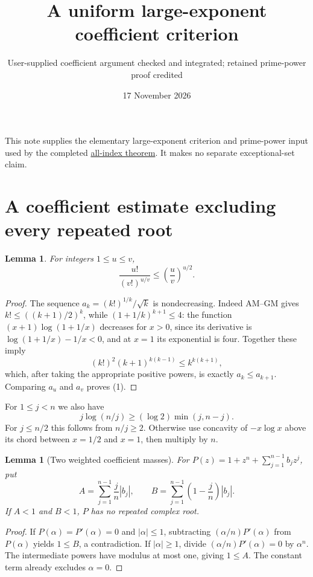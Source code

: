 \documentclass[11pt]{article}
\title{A uniform large-exponent coefficient criterion}
\author{User-supplied coefficient argument checked and integrated; retained prime-power proof credited}
\date{17 November 2026}
\newtheorem{lemma}[theorem]{Lemma}
\begin{document}
\maketitle
This note supplies the elementary large-exponent criterion and prime-power input used by the completed \href{ALL_UNIVARIATE_TWO_TERM_SFC.tex}{all-index theorem}. It makes no separate exceptional-set claim.

\section{A coefficient estimate excluding every repeated root}
\begin{lemma}\label{lem:factorial}
For integers $1\le u\le v$,
\[
 \frac{u!}{(v!)^{u/v}}\le\left(\frac uv\right)^{u/2}. \tag{1}
\]
\end{lemma}
\begin{proof}
The sequence $a_k=(k!)^{1/k}/\sqrt k$ is nondecreasing.
Indeed AM--GM gives $k!\le((k+1)/2)^k$, while
$(1+1/k)^{k+1}\le4$: the function
$(x+1)\log(1+1/x)$ decreases for $x>0$, since its derivative is
$\log(1+1/x)-1/x<0$, and at $x=1$ its exponential is four.
Together these imply
\[
 (k!)^2(k+1)^{k(k-1)}\le k^{k(k+1)},
\]
which, after taking the appropriate positive powers, is exactly
$a_k\le a_{k+1}$. Comparing $a_u$ and $a_v$ proves (1).
\end{proof}

For $1\le j<n$ we also have
\[
 j\log(n/j)\ge(\log2)\min(j,n-j). \tag{2}
\]
For $j\le n/2$ this follows from $n/j\ge2$.
Otherwise use concavity of $-x\log x$ above its chord between
$x=1/2$ and $x=1$, then multiply by $n$.

\begin{lemma}[Two weighted coefficient masses]\label{lem:masses}
For $P(z)=1+z^n+\sum_{j=1}^{n-1}b_jz^j$, put
\[
 A=\sum_{j=1}^{n-1}\frac jn|b_j|,\qquad
 B=\sum_{j=1}^{n-1}\left(1-\frac jn\right)|b_j|.
\]
If $A<1$ and $B<1$, $P$ has no repeated complex root.
\end{lemma}
\begin{proof}
If $P(\alpha)=P'(\alpha)=0$ and $|\alpha|\le1$, subtracting
$(\alpha/n)P'(\alpha)$ from $P(\alpha)$ yields $1\le B$, a contradiction.
If $|\alpha|\ge1$, divide $(\alpha/n)P'(\alpha)=0$ by $\alpha^n$.
The intermediate powers have modulus at most one, giving $1\le A$.
The constant term already excludes $\alpha=0$.
\end{proof}
\end{document}
